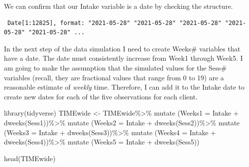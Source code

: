 \documentclass[
  english,
]{book}
\newenvironment{Shaded}{\begin{snugshade}}{\end{snugshade}}
\newcommand{\AttributeTok}[1]{\textcolor[rgb]{0.77,0.63,0.00}{#1}}
\newcommand{\FunctionTok}[1]{\textcolor[rgb]{0.00,0.00,0.00}{#1}}
\newcommand{\NormalTok}[1]{#1}
\newcommand{\OtherTok}[1]{\textcolor[rgb]{0.56,0.35,0.01}{#1}}
\newcommand{\SpecialCharTok}[1]{\textcolor[rgb]{0.00,0.00,0.00}{#1}}
\begin{document}
We can confirm that our Intake variable is a date by checking the structure.

\begin{Shaded}
\end{Shaded}

\begin{verbatim}
 Date[1:12825], format: "2021-05-28" "2021-05-28" "2021-05-28" "2021-05-28" "2021-05-28" ...
\end{verbatim}

In the next step of the data simulation I need to create Weeks\# variables that have a date. The date must consistently increase from Week1 through Week5. I am going to make the assumption that the simulated values for the Sess\# variables (recall, they are fractional values that range from 0 to 19) are a reasonable estimate of \emph{weekly} time. Therefore, I can add it to the Intake date to create new dates for each of the five observations for each client.

\begin{Shaded}
\begin{Highlighting}[]
\FunctionTok{library}\NormalTok{(tidyverse)}
\NormalTok{TIMEwide }\OtherTok{\textless{}{-}}\NormalTok{ TIMEwide}\SpecialCharTok{\%\textgreater{}\%}
  \FunctionTok{mutate}\NormalTok{ (}\AttributeTok{Weeks1 =}\NormalTok{ Intake }\SpecialCharTok{+} \FunctionTok{dweeks}\NormalTok{(Sess1))}\SpecialCharTok{\%\textgreater{}\%}
  \FunctionTok{mutate}\NormalTok{ (}\AttributeTok{Weeks2 =}\NormalTok{ Intake }\SpecialCharTok{+} \FunctionTok{dweeks}\NormalTok{(Sess2))}\SpecialCharTok{\%\textgreater{}\%}
  \FunctionTok{mutate}\NormalTok{ (}\AttributeTok{Weeks3 =}\NormalTok{ Intake }\SpecialCharTok{+} \FunctionTok{dweeks}\NormalTok{(Sess3))}\SpecialCharTok{\%\textgreater{}\%}
  \FunctionTok{mutate}\NormalTok{ (}\AttributeTok{Weeks4 =}\NormalTok{ Intake }\SpecialCharTok{+} \FunctionTok{dweeks}\NormalTok{(Sess4))}\SpecialCharTok{\%\textgreater{}\%}
  \FunctionTok{mutate}\NormalTok{ (}\AttributeTok{Weeks5 =}\NormalTok{ Intake }\SpecialCharTok{+} \FunctionTok{dweeks}\NormalTok{(Sess5))}

\FunctionTok{head}\NormalTok{(TIMEwide)}
\end{Highlighting}
\end{Shaded}
\end{document}
